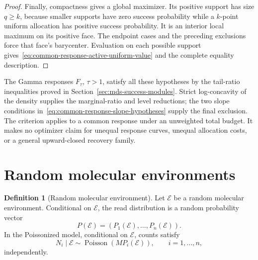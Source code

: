 \documentclass[11pt]{article}
\theoremstyle{definition}
\newtheorem{definition}{Definition}
\theoremstyle{remark}
\DeclareMathOperator{\Poisson}{Poisson}
\newcommand{\1}{\mathbf 1}
\begin{document}
\begin{proof}
Finally, compactness gives a global maximizer.  Its positive support
has size \(q\ge k\), because smaller supports have zero success
probability while a \(k\)-point uniform allocation has positive
success probability.  It is an interior local maximum on its
positive face.  The endpoint cases and the preceding exclusions
force that face's barycenter.  Evaluation on each possible support
gives~\eqref{eq:common-response-active-uniform-value} and the complete
equality description.
\end{proof}

The Gamma responses \(F_\tau\), \(\tau>1\), satisfy all these
hypotheses by the tail-ratio inequalities proved in
Section~\ref{sec:mds-success-modules}.  Strict log-concavity of the
density supplies the marginal-ratio and level reductions; the two
slope conditions in~\eqref{eq:common-response-slope-hypotheses}
supply the final exclusion.  The criterion applies to a common
response under an unweighted total budget.  It makes no optimizer
claim for unequal response curves, unequal allocation costs, or a
general upward-closed recovery family.

\section{Random molecular environments}\label{sec:random-environments}

\begin{definition}[Random molecular environment]
Let \(\mathcal E\) be a random molecular environment.  Conditional on \(\mathcal E\), the read distribution is a random probability vector
\[
  P(\mathcal E)=(P_1(\mathcal E),\ldots,P_n(\mathcal E)).
\]
In the Poissonized model, conditional on \(\mathcal E\), counts satisfy
\[
  N_i\mid \mathcal E\sim \Poisson(MP_i(\mathcal E)),
  \qquad i=1,\ldots,n,
\]
independently.
\end{definition}
\end{document}
